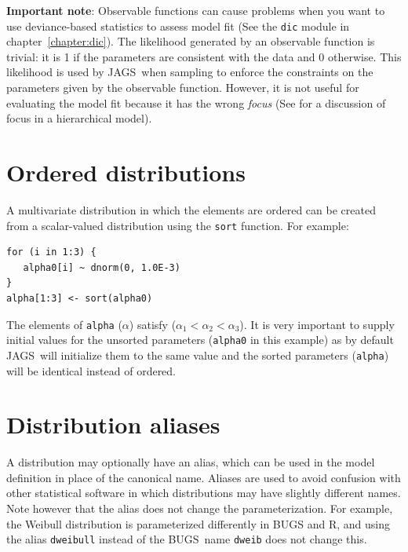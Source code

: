 \documentclass[11pt, a4paper, titlepage]{report}
\newcommand{\JAGS}{\textsf{JAGS}}
\newcommand{\BUGS}{\textsf{BUGS}}
\newcommand{\R}{\textsf{R}}
\begin{document}
{\bf Important note}: Observable functions can cause problems when you
want to use deviance-based statistics to assess model fit (See the
\texttt{dic} module in chapter~\ref{chapter:dic}). The likelihood
generated by an observable function is trivial: it is 1 if the
parameters are consistent with the data and 0 otherwise. This
likelihood is used by \JAGS\ when sampling to enforce the constraints
on the parameters given by the observable function. However, it is not
useful for evaluating the model fit because it has the wrong {\em
  focus} (See \citet{spiegelhalter:etal:2002} for a discussion of
focus in a hierarchical model).

\section{Ordered distributions}

A multivariate distribution in which the elements are ordered can be
created from a scalar-valued distribution using the \texttt{sort}
function. For example:
\begin{verbatim}
for (i in 1:3) {
   alpha0[i] ~ dnorm(0, 1.0E-3)
}
alpha[1:3] <- sort(alpha0)
\end{verbatim}
The elements of \texttt{alpha} ($\alpha$) satisfy ($\alpha_1 <
\alpha_2 < \alpha_3$). It is very important to supply initial values
for the unsorted parameters (\texttt{alpha0} in this example) as by
default \JAGS\ will initialize them to the same value and the sorted
parameters (\texttt{alpha}) will be identical instead of ordered.

\section{Distribution aliases}

A distribution may optionally have an alias, which can be used in the
model definition in place of the canonical name. Aliases are used to
avoid confusion with other statistical software in which distributions
may have slightly different names. Note however that the alias does
not change the parameterization. For example, the Weibull distribution
is parameterized differently in BUGS and \R, and using the alias
\texttt{dweibull} instead of the \BUGS\ name \texttt{dweib} does not
change this.

\end{document}
